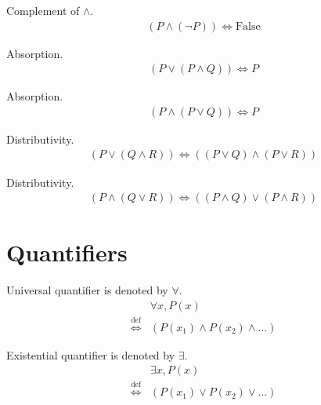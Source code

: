 \begin{prop}
\label{Proposition:land_complement}
Complement of $\land$.
\begin{align*}
(P \land (\lnot P)) \iff \text{False}
\end{align*}
\end{prop}

\begin{prop}
\label{Proposition:lor_land_absorption}
Absorption.
\begin{align*}
(P \lor (P \land Q)) \iff P
\end{align*}
\end{prop}

\begin{prop}
\label{Proposition:land_lor_absorption}
Absorption.
\begin{align*}
(P \land (P \lor Q)) \iff P
\end{align*}
\end{prop}

\begin{prop}
\label{Proposition:lor_land_distributivity}
Distributivity.
\begin{align*}
(P \lor (Q \land R)) \iff ((P \lor Q) \land (P \lor R))
\end{align*}
\end{prop}

\begin{prop}
\label{Proposition:land_lor_distributivity}
Distributivity.
\begin{align*}
(P \land (Q \lor R)) \iff ((P \land Q) \lor (P \land R))
\end{align*}
\end{prop}

\section{Quantifiers}
\begin{defn}
Universal quantifier is denoted by $\forall$.
\begin{align*}
& \forall x, P(x) \\
\overset{\operatorname{def}}{\iff} & (P(x_1) \land P(x_2) \land \dots)
\end{align*}
\end{defn}

\begin{defn}
Existential quantifier is denoted by $\exists$.
\begin{align*}
& \exists x, P(x) \\
\overset{\operatorname{def}}{\iff} & (P(x_1) \lor P(x_2) \lor \dots)
\end{align*}
\end{defn}

